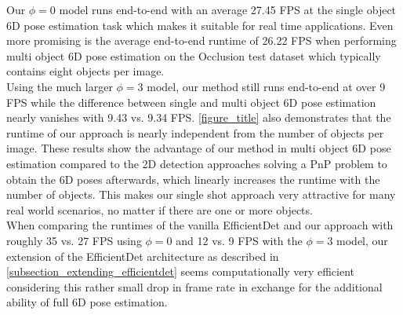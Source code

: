\documentclass[twocolumn, 10pt, letterpaper]{article}
\begin{document}
Our $\phi = 0$ model runs end-to-end with an average 27.45 FPS at the single object 6D pose estimation task which makes it suitable for real time applications. Even more promising is the average end-to-end runtime of 26.22 FPS when performing multi object 6D pose estimation on the Occlusion test dataset which typically contains eight objects per image.\\ Using the much larger $\phi = 3$ model, our method still runs end-to-end at over 9 FPS while the difference between single and multi object 6D pose estimation nearly vanishes with 9.43 vs. 9.34 FPS. \autoref{figure_title} also demonstrates that the runtime of our approach is nearly independent from the number of objects per image. These results show the advantage of our method in multi object 6D pose estimation compared to the 2D detection approaches solving a PnP problem to obtain the 6D poses afterwards, which linearly increases the runtime with the number of objects. This makes our single shot approach very attractive for many real world scenarios, no matter if there are one or more objects.\\
When comparing the runtimes of the vanilla EfficientDet and our approach with roughly 35 vs. 27 FPS using $\phi = 0$ and 12 vs. 9 FPS with the $\phi = 3$ model, our extension of the EfficientDet architecture as described in \autoref{subsection_extending_efficientdet} seems computationally very efficient considering this rather small drop in frame rate in exchange for the additional ability of full 6D pose estimation.
\end{document}
